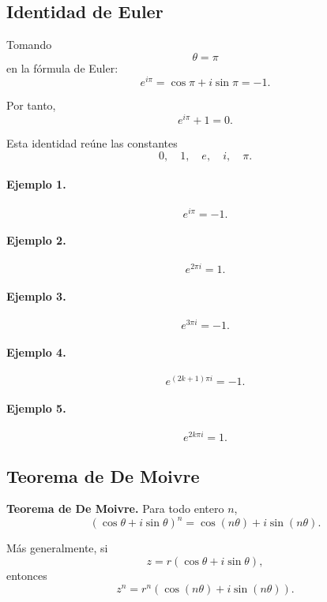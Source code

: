 \subsection{Identidad de Euler}

Tomando
\[
\theta=\pi
\]
en la fórmula de Euler:
\[
e^{i\pi}
=
\cos\pi+i\sin\pi
=
-1.
\]

Por tanto,
\[
\boxed{
e^{i\pi}+1=0.
}
\]

Esta identidad reúne las constantes
\[
0,\quad1,\quad e,\quad i,\quad\pi.
\]

\paragraph{Ejemplo 1.}
\[
e^{i\pi}=-1.
\]

\paragraph{Ejemplo 2.}
\[
e^{2\pi i}=1.
\]

\paragraph{Ejemplo 3.}
\[
e^{3\pi i}=-1.
\]

\paragraph{Ejemplo 4.}
\[
e^{(2k+1)\pi i}=-1.
\]

\paragraph{Ejemplo 5.}
\[
e^{2k\pi i}=1.
\]

\subsection{Teorema de De Moivre}

\textbf{Teorema de De Moivre.}
Para todo entero $n$,
\[
\boxed{
(\cos\theta+i\sin\theta)^n
=
\cos(n\theta)+i\sin(n\theta).
}
\]

Más generalmente, si
\[
z=r(\cos\theta+i\sin\theta),
\]
entonces
\[
\boxed{
z^n
=
r^n
\left(
\cos(n\theta)+i\sin(n\theta)
\right).
}
\]

